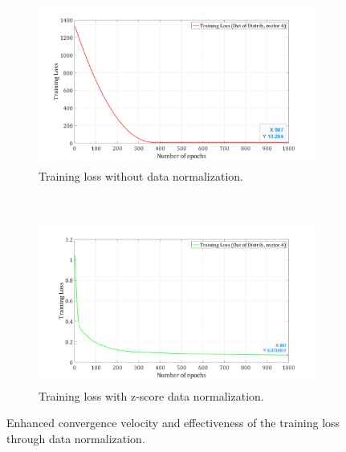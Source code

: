 \documentclass{ifacconf}
\begin{document}
\begin{figure}[t!]
	\centering
	\begin{subfigure}[b]{1.\columnwidth}
		\centering
		\includegraphics[height=2.1in]{./pictures/applications/Unormalized_zoomed.png}
		\caption{Training loss without data normalization.}
	\end{subfigure}%
	~ 
	\begin{subfigure}[b]{1.\columnwidth}
		\centering
		\includegraphics[height=2.1in]{./pictures/applications/Normalized_zoomed.png}
		\caption{Training loss with z-score data normalization.}
	\end{subfigure}
	\caption{Enhanced  convergence velocity and effectiveness of the training loss through data normalization.}
	\label{trainingloss}
\end{figure}
\end{document}
